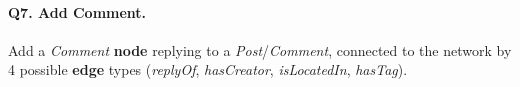 \paragraph{\textbf{Q7}. Add Comment.}
Add a \emph{Comment} \textbf{node} replying to a
\emph{Post}/\emph{Comment}, connected to the network by 4 possible
\textbf{edge} types (\emph{replyOf}, \emph{hasCreator},
\emph{isLocatedIn}, \emph{hasTag}).
